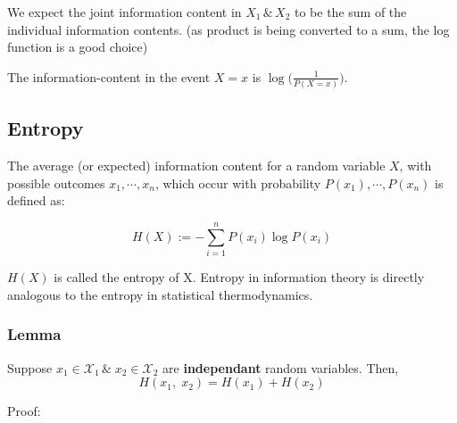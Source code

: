 \documentclass{article}
\begin{document}
We expect the joint information content in $X_1\, \&\, X_2$ to be the sum of the individual information contents. (as product is being converted to a sum, the log function is a good choice)

The information-content in the event $X=x$ is $\log( {\frac{1}{P(X=x)})}$.

\subsection{Entropy}

The average (or expected) information content for a random variable $X$, with possible outcomes $x_1, \cdots, x_n$, which occur with probability $P(x_1),\cdots, P(x_n)$ is defined as:

$$ H(X) :=- \sum_{i=1}^{n} P(x_i) \log P(x_i)$$

$H(X)$ is called the entropy of X. Entropy in information theory is directly analogous to the entropy in statistical thermodynamics.

\subsubsection{Lemma}
Suppose $x_1 \in \mathcal{X}_1\, \&\; x_2 \in \mathcal{X}_2$ are \textbf{independant} random variables. Then,
$$ H(x_1,\;x_2)=H(x_1)+H(x_2)$$

Proof: %
\end{document}
